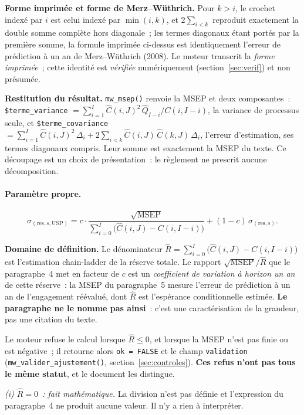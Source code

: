 \documentclass[a4paper,11pt]{article}
\newcommand{\code}[1]{\texttt{\small #1}}
\begin{document}
\begin{encadre}
\textbf{Forme imprimée et forme de Merz--Wüthrich.} Pour $k > i$, le crochet
indexé par $i$ est celui indexé par $\min(i,k)$, et $2\sum_{i<k}$ reproduit
exactement la double somme complète hors diagonale~; les termes diagonaux étant
portés par la première somme, la formule imprimée ci-dessus est identiquement
l'erreur de prédiction à un an de Merz--Wüthrich (2008). Le moteur transcrit la
\emph{forme imprimée}~; cette identité est \emph{vérifiée} numériquement
(section~\ref{sec:verif}) et non présumée.

\medskip
\textbf{Restitution du résultat.} \code{mw\_msep()} renvoie la MSEP et deux
composantes~: \code{\$terme\_variance} $=\sum_{i=1}^{I}\hat C(i,J)^2\,
\hat Q_{I-i}/C(i,I-i)$, la variance de processus seule, et
\code{\$terme\_covariance} $=\sum_{i=1}^{I}\hat C(i,J)^2\,\Delta_i
+ 2\sum_{i<k}\hat C(i,J)\,\hat C(k,J)\,\Delta_i$, l'erreur d'estimation, ses
termes diagonaux compris. Leur somme est exactement la MSEP du texte. Ce
découpage est un choix de présentation~: le règlement ne prescrit aucune
décomposition.
\end{encadre}

\paragraph{Paramètre propre.}
\[
  \sigma_{(\text{res},s,\mathrm{USP})}
  = c\cdot\frac{\sqrt{\mathrm{MSEP}}}{\sum_{i=0}^{I}\big(\hat C(i,J) - C(i,I-i)\big)}
  + (1-c)\,\sigma_{(\text{res},s)} .
\]

\noindent
\textbf{Domaine de définition.} Le dénominateur
$\hat R = \sum_{i=0}^{I}\big(\hat C(i,J) - C(i,I-i)\big)$ est l'estimation
chain-ladder de la réserve totale. Le rapport $\sqrt{\mathrm{MSEP}}/\hat R$ que
le paragraphe~4 met en facteur de $c$ est un \emph{coefficient de variation à
horizon un an} de cette réserve~: la MSEP du paragraphe~5 mesure l'erreur de
prédiction à un an de l'engagement réévalué, dont $\hat R$ est l'espérance
conditionnelle estimée. \textbf{Le paragraphe ne le nomme pas ainsi}~: c'est une
caractérisation de la grandeur, pas une citation du texte.

Le moteur refuse le calcul lorsque $\hat R \le 0$, et lorsque la MSEP n'est pas
finie ou est négative~; il retourne alors \code{ok = FALSE} et le champ
\code{validation} (\code{mw\_valider\_ajustement()},
section~\ref{sec:controles}). \textbf{Ces refus n'ont pas tous le même statut},
et le document les distingue.

\emph{(i) $\hat R = 0$~: fait mathématique.} La division n'est pas définie et
l'expression du paragraphe~4 ne produit aucune valeur. Il n'y a rien à
interpréter.
\end{document}
